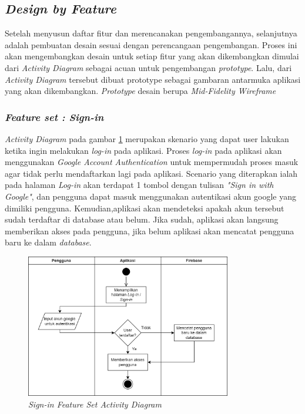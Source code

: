 \subsection{\textit{Design by Feature}}
Setelah menyusun daftar fitur dan merencanakan pengembangannya, selanjutnya adalah pembuatan desain sesuai dengan perencangaan pengembangan.
Proses ini akan mengembangkan desain untuk setiap fitur yang akan dikembangkan dimulai dari \textit{Activity Diagram} sebagai acuan untuk pengembangan \textit{prototype}. 
Lalu, dari \textit{Activity Diagram} tersebut dibuat prototype sebagai gambaran antarmuka aplikasi yang akan dikembangkan.
\textit{Prototype} desain berupa \textit{Mid-Fidelity Wireframe}
\subsubsection{\textit{Feature set : Sign-in}}
\textit{Activity Diagram} pada gambar \ref*{Fig:ActivityDiagramSignIn} merupakan skenario yang dapat user lakukan ketika ingin melakukan \textit{log-in} pada aplikasi.
Proses \textit{log-in} pada aplikasi akan menggunakan \textit{Google Account Authentication} untuk mempermudah proses masuk agar tidak perlu mendaftarkan lagi pada aplikasi.
Scenario yang diterapkan ialah pada halaman \textit{Log-in} akan terdapat 1 tombol dengan tulisan \textit{"Sign in with Google"}, dan pengguna dapat masuk menggunakan autentikasi akun google yang dimiliki pengguna.
Kemudian,aplikasi akan mendeteksi apakah akun tersebut sudah terdaftar di database atau belum. Jika sudah, aplikasi akan langsung memberikan akses pada pengguna, jika belum aplikasi akan mencatat pengguna baru ke dalam \textit{database}.
\begin{figure}[H]
	\centering
	\includegraphics[width=0.8\textwidth]{contents/chapter-3/images/AD-signin.png}
	\caption{\textit{Sign-in Feature Set Activity Diagram}}
	\label{Fig:ActivityDiagramSignIn}
\end{figure}
